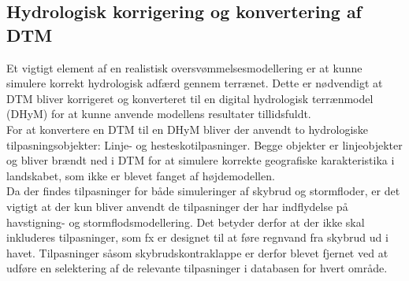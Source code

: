 
\subsection{Hydrologisk korrigering og konvertering af DTM} \label{Sektion: Konvertering af DTM til DHyM}
Et vigtigt element af en realistisk oversvømmelsesmodellering er at kunne simulere korrekt hydrologisk adfærd gennem terrænet. Dette er nødvendigt at DTM bliver korrigeret og konverteret til en digital hydrologisk terrænmodel (DHyM) for at kunne anvende modellens resultater tillidsfuldt.\\ 

For at konvertere en DTM til en DHyM bliver der anvendt to hydrologiske tilpasningsobjekter: Linje- og hesteskotilpasninger. Begge objekter er linjeobjekter og bliver brændt ned i DTM for at simulere korrekte geografiske karakteristika i landskabet, som ikke er blevet fanget af højdemodellen.\\
Da der findes tilpasninger for både simuleringer af skybrud og stormfloder, er det vigtigt at der kun bliver anvendt de tilpasninger der har indflydelse på havstigning- og stormflodsmodellering. Det betyder derfor at der ikke skal inkluderes tilpasninger, som fx er designet til at føre regnvand fra skybrud ud i havet. Tilpasninger såsom skybrudskontraklappe er derfor blevet fjernet ved at udføre en selektering af de relevante tilpasninger i databasen for hvert område.\\

